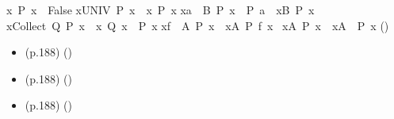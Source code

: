 \begin{isabellebody}
\begin{isamarkuptext}
\begin{itemize}
{{\isacharparenleft}{\isasymexists}x{\isasymin}{\isasymemptyset}{\isachardot}\ P\ x{\isacharparenright}\ {\isacharequal}\ False\isasep\isanewline%
{\isacharparenleft}{\isasymexists}x{\isasymin}UNIV{\isachardot}\ P\ x{\isacharparenright}\ {\isacharequal}\ {\isacharparenleft}{\isasymexists}x{\isachardot}\ P\ x{\isacharparenright}\isasep\isanewline%
{\isacharparenleft}{\isasymexists}x{\isasymin}{\isacharbraceleft}a{\isacharbraceright}\ {\isasymunion}\ B{\isachardot}\ P\ x{\isacharparenright}\ {\isacharequal}\ {\isacharparenleft}P\ a\ {\isasymor}\ {\isacharparenleft}{\isasymexists}x{\isasymin}B{\isachardot}\ P\ x{\isacharparenright}{\isacharparenright}\isasep\isanewline%
{\isacharparenleft}{\isasymexists}x{\isasymin}Collect\ Q{\isachardot}\ P\ x{\isacharparenright}\ {\isacharequal}\ {\isacharparenleft}{\isasymexists}x{\isachardot}\ Q\ x\ {\isasymand}\ P\ x{\isacharparenright}\isasep\isanewline%
{\isacharparenleft}{\isasymexists}x{\isasymin}f\ {\isacharbackquote}\ A{\isachardot}\ P\ x{\isacharparenright}\ {\isacharequal}\ {\isacharparenleft}{\isasymexists}x{\isasymin}A{\isachardot}\ P\ {\isacharparenleft}f\ x{\isacharparenright}{\isacharparenright}\isasep\isanewline%
{\isacharparenleft}{\isasymnot}\ {\isacharparenleft}{\isasymexists}x{\isasymin}A{\isachardot}\ P\ x{\isacharparenright}{\isacharparenright}\ {\isacharequal}\ {\isacharparenleft}{\isasymforall}x{\isasymin}A{\isachardot}\ {\isasymnot}\ P\ x{\isacharparenright}} 
      \hfill ()
  \end{itemize}%
\end{isamarkuptext}\isamarkuptrue%
%
\isadelimdocument
%
\endisadelimdocument
%
\isatagdocument
%
\isamarkuptrue%
%
\endisatagdocument
{\isafolddocument}%
%
\isadelimdocument
%
\endisadelimdocument
%
\begin{isamarkuptext}%
\begin{itemize}
    \item (p.188)  
      \hfill ()
    \item (p.188)  
      \hfill ()
    \item (p.188)  
      \hfill ()

\end{itemize}
\end{isamarkuptext}
\end{isabellebody}
